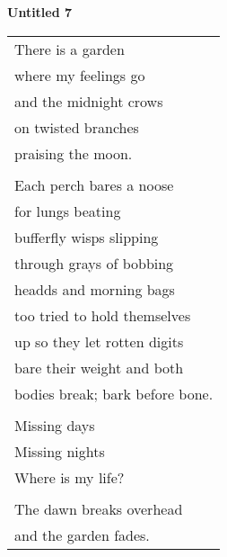 \documentclass{article}
\begin{document}
\begin{center}
\textbf{Untitled 7} \\
\vspace*{2ex}
\begin{tabular}{l}
There is a garden \\
where my feelings go \\
and the midnight crows \\
on twisted branches \\
praising the moon. \\
\\
Each perch bares a noose \\
for lungs beating \\
bufferfly wisps slipping \\
through grays of bobbing \\
headds and morning bags \\
too tried to hold themselves \\
up so they let rotten digits \\
bare their weight and both \\
bodies break; bark before bone. \\
\\
Missing days \\
Missing nights \\
Where is my life? \\
\\
The dawn breaks overhead \\
and the garden fades. \\
\end{tabular}
\end{center}
\end{document}
